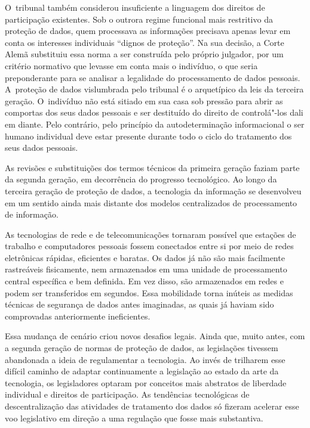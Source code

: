 O~tribunal também considerou insuficiente a linguagem dos direitos de
participação existentes. Sob o outrora regime funcional mais restritivo
da proteção de dados, quem processava as informações precisava apenas
levar em conta os interesses individuais ``dignos de proteção''. Na sua
decisão, a Corte Alemã substituiu essa norma a ser construída pelo
próprio julgador, por um critério normativo que levasse em conta mais o
indivíduo, o que seria preponderante para se analisar a legalidade do
processamento de dados pessoais. A~proteção de dados vislumbrada pelo
tribunal é o arquetípico da leis da terceira geração. O~indivíduo não
está sitiado em sua casa sob pressão para abrir as comportas dos seus
dados pessoais e ser destituído do direito de controlá"-los dali em
diante. Pelo contrário, pelo princípio da autodeterminação informacional
o ser humano individual deve estar presente durante todo o ciclo do
tratamento dos seus dados pessoais.

As revisões e substituições dos termos técnicos da primeira geração
faziam parte da segunda geração, em decorrência do progresso
tecnológico. Ao longo da terceira geração de proteção de dados, a
tecnologia da informação se desenvolveu em um sentido ainda mais
distante dos modelos centralizados de processamento de informação.

As tecnologias de rede e de telecomunicações tornaram possível que
estações de trabalho e computadores pessoais fossem conectados entre si
por meio de redes eletrônicas rápidas, eficientes e baratas. Os dados já
não são mais facilmente rastreáveis fisicamente, nem armazenados em uma
unidade de processamento central específica e bem definida. Em vez
disso, são armazenados em redes e podem ser transferidos em segundos.
Essa mobilidade torna inúteis as medidas técnicas de segurança de dados
antes imaginadas, as quais já haviam sido comprovadas anteriormente
ineficientes.

Essa mudança de cenário criou novos desafios legais. Ainda que, muito
antes, com a segunda geração de normas de proteção de dados, as
legislações tivessem abandonada a ideia de regulamentar a tecnologia. Ao
invés de trilharem esse difícil caminho de adaptar continuamente a
legislação ao estado da arte da tecnologia, os legisladores optaram por
conceitos mais abstratos de liberdade individual e direitos de
participação. As tendências tecnológicas de descentralização das
atividades de tratamento dos dados só fizeram acelerar esse voo
legislativo em direção a uma regulação que fosse mais substantiva.

